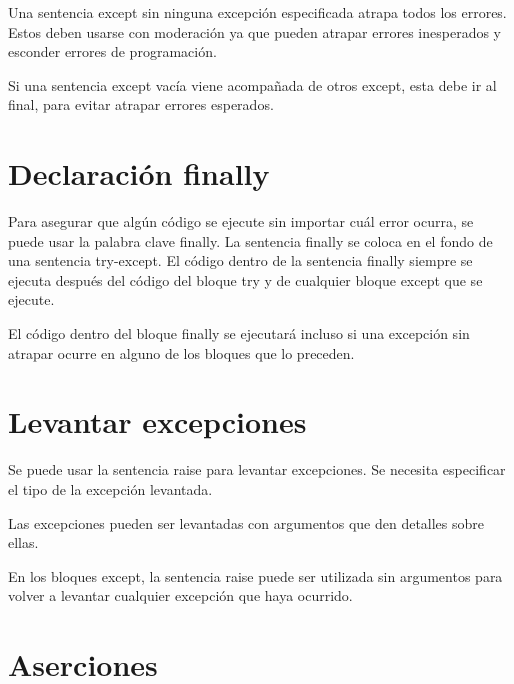 \documentclass{report}
\begin{document}
{

Una sentencia except sin ninguna excepción especificada atrapa todos los errores. Estos deben usarse con moderación ya que pueden atrapar errores inesperados y esconder errores de programación.


Si una sentencia except vacía viene acompañada de otros except, esta debe ir al final, para evitar atrapar errores esperados.

\section{Declaración finally}

Para asegurar que algún código se ejecute sin importar cuál error ocurra, se puede usar la palabra clave finally. La sentencia finally se coloca en el fondo de una sentencia try-except. El código dentro de la sentencia finally siempre se ejecuta después del código del bloque try y de cualquier bloque except que se ejecute.


El código dentro del bloque finally se ejecutará incluso si una excepción sin atrapar ocurre en alguno de los bloques que lo preceden.


\section{Levantar excepciones}

Se puede usar la sentencia raise para levantar excepciones. Se necesita especificar el tipo de la excepción levantada.


Las excepciones pueden ser levantadas con argumentos que den detalles sobre ellas.



En los bloques except, la sentencia raise puede ser utilizada sin argumentos para volver a levantar cualquier excepción que haya ocurrido.


\section{Aserciones}

}
\end{document}
